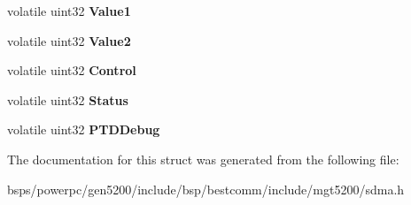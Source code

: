 \begin{DoxyCompactItemize}
\item 
\mbox{\label{structsdma__register__set_af11d45af7d287261aeb8709cf3c7fd2a}} 
volatile uint32 {\bfseries Value1}
\item 
\mbox{\label{structsdma__register__set_aae4f614fd8e6ed52ae90e3e9129cb409}} 
volatile uint32 {\bfseries Value2}
\item 
\mbox{\label{structsdma__register__set_ab67096178b2d7484119659d749a1d01e}} 
volatile uint32 {\bfseries Control}
\item 
\mbox{\label{structsdma__register__set_a89f192f0337b08cbce35487e9615782f}} 
volatile uint32 {\bfseries Status}
\item 
\mbox{\label{structsdma__register__set_a5bd8058a0117547e5c00266d38a95671}} 
volatile uint32 {\bfseries P\+T\+D\+Debug}
\end{DoxyCompactItemize}


The documentation for this struct was generated from the following file\+:\begin{DoxyCompactItemize}
\item 
bsps/powerpc/gen5200/include/bsp/bestcomm/include/mgt5200/sdma.\+h\end{DoxyCompactItemize}

